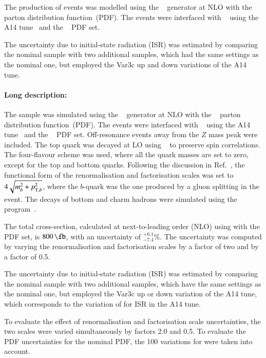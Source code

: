 The production of \tZq events was modelled using the \MGNLO[2.3.3]~\cite{Alwall:2014hca}
generator at NLO with the \NNPDF[3.0nlo]~\cite{Ball:2014uwa} parton distribution function~(PDF).
The events were interfaced with \PYTHIA[8.230]~\cite{Sjostrand:2014zea} using the A14 tune~\cite{ATL-PHYS-PUB-2014-021} and the
\NNPDF[2.3lo]~\cite{Ball:2014uwa} PDF set.

The uncertainty due to initial-state radiation (ISR) was estimated by comparing the nominal \tZq sample with two additional samples,
which had the same settings as the nominal one, but employed the Var3c up and down variations of the A14 tune.


\paragraph{Long description:}

The \tZq sample was simulated using the \MGNLO[2.3.3]~\cite{Alwall:2014hca}
generator at NLO with the \NNPDF[3.0nlo]~\cite{Ball:2014uwa} parton distribution function~(PDF). The events were interfaced with
\PYTHIA[8.230]~\cite{Sjostrand:2014zea} using the A14 tune~\cite{ATL-PHYS-PUB-2014-021}
and the \NNPDF[2.3lo]~\cite{Ball:2014uwa} PDF set. Off-resonance events away from the \(Z\) mass peak were included.
The top quark was decayed at LO using \MADSPIN~\cite{Frixione:2007zp,Artoisenet:2012st} to preserve spin correlations.
The four-flavour scheme was used, where all the quark masses are set to zero, except for the top and bottom quarks.
Following the discussion in Ref.~\cite{Frederix:2012dh}, the functional form of the renormalisation and factorisation scales
was set to \(4\sqrt{m_b^2+\pTX[2][b]}\), where the \(b\)-quark was the one produced by a gluon splitting in the event.
The decays of bottom and charm hadrons were simulated using the \EVTGEN program~\cite{Lange:2001uf}.

The \tZq total cross-section, calculated at next-to-leading order (NLO) using \MGNLO[2.3.3] with the \NNPDF[3.0nlo] PDF set,
is \(\qty{800}{\fb}\), with an uncertainty of \(^{+6.1}_{-7.4}\)\%. The uncertainty was computed by varying the renormalisation and
factorisation scales by a factor of two and by a factor of 0.5.

The uncertainty due to initial-state radiation (ISR) was estimated by comparing the nominal \tZq sample with two additional samples,
which have the same settings as the nominal one, but employed the Var3c up or down variation of the A14 tune, which
corresponds to the variation of \alphas for ISR in the A14 tune.

To evaluate the effect of renormalisation and factorisation scale uncertainties, the two scales were varied simultaneously by factors 2.0 and 0.5.
To evaluate the PDF uncertainties for the nominal PDF, the 100 variations for \NNPDF[2.3lo] were taken into account.
